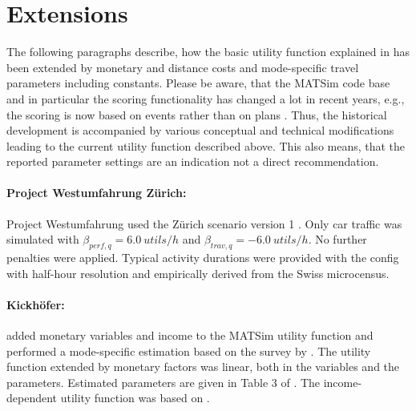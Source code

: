 \section{Extensions}
\label{sec:utfextensions}
The following paragraphs describe, how the basic utility function explained in \citet[][]{CharyparNagel_Transportation_2005} has been extended by monetary and distance costs and mode-specific travel parameters including constants. Please be aware, that the MATSim code base and in particular the scoring functionality has changed a lot in recent years, e.g., the scoring is now based on events rather than on plans . Thus, the historical development is accompanied by various conceptual and technical modifications leading to the current utility function described above. This also means, that the reported parameter settings are an indication not a direct recommendation.

\paragraph{Project Westumfahrung Zürich:}
Project Westumfahrung \citep[][]{BalmerEtAl_ResRep_bdktzrh_2009} used the Zürich scenario version 1 \citep[][]{HorniEtAl_TechRep_IVT_2011_a}. Only car traffic was simulated with $\beta_{perf,q}=6.0\ utils/h$ and $\beta_{trav,q}=-6.0\  utils/h$. No further penalties were applied. Typical activity durations were provided with the config with half-hour resolution and empirically derived from the Swiss microcensus.

\paragraph{Kickhöfer:}
\citet[][]{Kickhoefer_MastersThesis_2009} added monetary variables and income to the MATSim utility function and performed a mode-specific estimation based on the survey by \citet[][]{VrticEtAl_ResRep_SVI_2007}. The utility function extended by monetary factors was linear, both in the variables and the parameters. Estimated parameters are given in Table 3 of \citet[][]{Kickhoefer_MastersThesis_2009}. The income-dependent utility function was based on \citet[][]{Franklin_PhDThesis_2006}.

